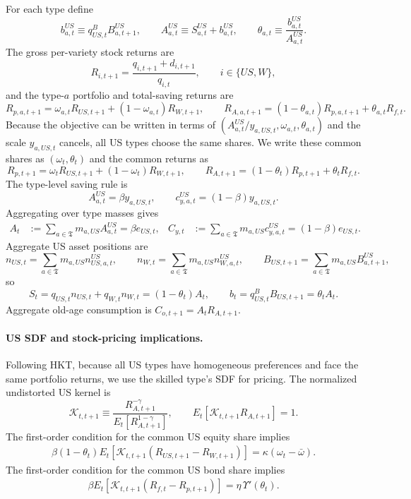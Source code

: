 \documentclass{article}
\begin{document}
For each type define
\[
b_{a,t}^{US}\equiv q^B_{US,t}B^{US}_{a,t+1},
\qquad
A^{US}_{a,t}\equiv S^{US}_{a,t}+b^{US}_{a,t},
\qquad
\theta_{a,t}\equiv\frac{b^{US}_{a,t}}{A^{US}_{a,t}}.
\]
The gross per-variety stock returns are
\[
R_{i,t+1}=\frac{q_{i,t+1}+d_{i,t+1}}{q_{i,t}},
\qquad i\in\{US,W\},
\]
and the type-$a$ portfolio and total-saving returns are
\[
R_{p,a,t+1}=\omega_{a,t}R_{US,t+1}+(1-\omega_{a,t})R_{W,t+1},
\qquad
R_{A,a,t+1}=(1-\theta_{a,t})R_{p,a,t+1}+\theta_{a,t}R_{f,t}.
\]
Because the objective can be written in terms of $(A^{US}_{a,t}/y_{a,US,t},\omega_{a,t},\theta_{a,t})$ and the scale $y_{a,US,t}$ cancels, all US types choose the same shares. We write these common shares as $(\omega_t,\theta_t)$ and the common returns as
\[
R_{p,t+1}=\omega_tR_{US,t+1}+(1-\omega_t)R_{W,t+1},
\qquad
R_{A,t+1}=(1-\theta_t)R_{p,t+1}+\theta_tR_{f,t}.
\]
The type-level saving rule is
\[
A^{US}_{a,t}=\beta y_{a,US,t},
\qquad
c^{US}_{y,a,t}=(1-\beta)y_{a,US,t}.
\]
Aggregating over type masses gives
\begin{align}\label{US_saving_rule_bond_cost}
A_t&:=\sum_{a\in\mathfrak T}m_{a,US}A^{US}_{a,t}=\beta e_{US,t},
&
C_{y,t}&:=\sum_{a\in\mathfrak T}m_{a,US}c^{US}_{y,a,t}=(1-\beta)e_{US,t}.
\end{align}
Aggregate US asset positions are
\[
n_{US,t}=\sum_{a\in\mathfrak T}m_{a,US}n^{US}_{US,a,t},
\qquad
n_{W,t}=\sum_{a\in\mathfrak T}m_{a,US}n^{US}_{W,a,t},
\qquad
B_{US,t+1}=\sum_{a\in\mathfrak T}m_{a,US}B^{US}_{a,t+1},
\]
so
\[
S_t=q_{US,t}n_{US,t}+q_{W,t}n_{W,t}=(1-\theta_t)A_t,
\qquad
b_t=q^B_{US,t}B_{US,t+1}=\theta_t A_t.
\]
Aggregate old-age consumption is $C_{o,t+1}=A_tR_{A,t+1}$.

\paragraph{US SDF and stock-pricing implications.}
Following HKT, because all US types have homogeneous preferences and face the same portfolio returns, we use the skilled type's SDF for pricing. The normalized undistorted US kernel is
\begin{equation}\label{US_K_def}
\mathcal K_{t,t+1}
\equiv
\frac{R_{A,t+1}^{-\gamma}}{E_t\!\left[R_{A,t+1}^{1-\gamma}\right]},
\qquad
E_t\!\left[\mathcal K_{t,t+1}R_{A,t+1}\right]=1.
\end{equation}
The first-order condition for the common US equity share implies
\begin{align}\label{US_omega_FOC_bond_cost}
\beta(1-\theta_t)
E_t\!\left[\mathcal K_{t,t+1}(R_{US,t+1}-R_{W,t+1})\right]
=
\kappa(\omega_t-\bar\omega).
\end{align}
The first-order condition for the common US bond share implies
\begin{align}\label{US_theta_FOC_bond_cost}
\beta
E_t\!\left[\mathcal K_{t,t+1}(R_{f,t}-R_{p,t+1})\right]
=
\eta\,\Upsilon'(\theta_t).
\end{align}
\end{document}
